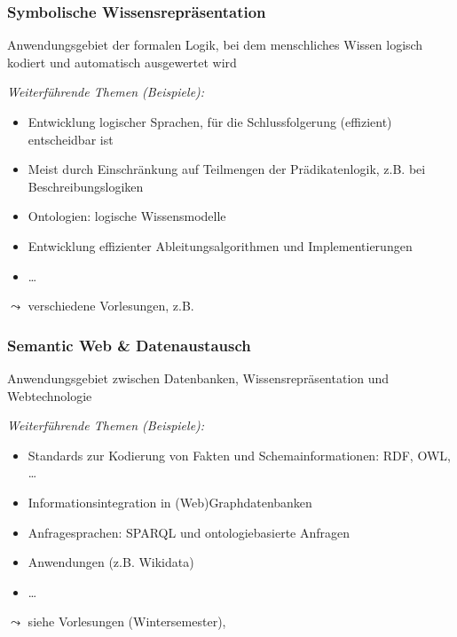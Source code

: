 \documentclass[aspectratio=1610,onlymath]{beamer}
\begin{document}
\begin{frame}\frametitle{Symbolische Wissensrepräsentation}

Anwendungsgebiet der formalen Logik, bei dem menschliches Wissen logisch kodiert und automatisch ausgewertet wird
\bigskip

\emph{Weiterführende Themen (Beispiele):}
\begin{itemize}
\item Entwicklung logischer Sprachen, für die Schlussfolgerung (effizient) entscheidbar ist
\item Meist durch Einschränkung auf Teilmengen der Prädikatenlogik, z.B. bei Beschreibungslogiken
\item Ontologien: logische Wissensmodelle
\item Entwicklung effizienter Ableitungsalgorithmen und Implementierungen
\item \ldots
\end{itemize}

$\leadsto$ verschiedene Vorlesungen, z.B. 

\end{frame}

\begin{frame}\frametitle{Semantic Web \& Datenaustausch}

Anwendungsgebiet zwischen Datenbanken, Wissensrepräsentation und Webtechnologie
\bigskip

\emph{Weiterführende Themen (Beispiele):}
\begin{itemize}
\item Standards zur Kodierung von Fakten und Schemainformationen: RDF, OWL, \ldots
\item Informationsintegration in (Web)Graphdatenbanken
\item Anfragesprachen: SPARQL und ontologiebasierte Anfragen
\item Anwendungen (z.B. Wikidata)
\item \ldots
\end{itemize}

$\leadsto$ siehe Vorlesungen  (Wintersemester), 

\end{frame}

\end{document}
